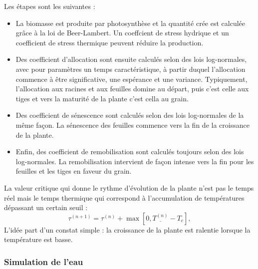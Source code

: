 Les étapes sont les suivantes : 

\begin{itemize}

\item La biomasse est produite par photosynthèse et la quantité crée est calculée grâce à la loi de Beer-Lambert.  Un coeffcient de stress hydrique et un coefficient de stress thermique peuvent réduire la production.

\item Des coefficient d'allocation sont ensuite calculés selon des lois log-normales, avec pour paramètres un temps caractéristique, à partir duquel l'allocation commence à être significative, une espérance et une variance. Typiquement, l'allocation aux racines et aux feuilles domine au départ, puis c'est celle aux tiges et vers la maturité de la plante c'est cella au grain.

\item Des coefficient de sénescence sont calculés selon des lois log-normales de la même façon. La sénescence des feuilles commence vers la fin de la croissance de la plante.

\item Enfin, des coefficient de remobilisation sont calculés toujours selon des lois log-normales. La remobilisation intervient de façon intense vers la fin pour les feuilles et les tiges en faveur du grain.

\end{itemize}

La valeur critique qui donne le rythme d'évolution de la plante n'est pas le temps réel mais le temps thermique qui correspond à l'accumulation de températures dépassant un certain seuil :
\[
\tau^{(n+1)} = \tau^{(n)} + \max[0, \underline{T^{(n)}} - T_c], 
\]
L'idée part d'un constat simple : la croissance de la plante est ralentie lorsque la température est basse.



\subsubsection{Simulation de l'eau}

